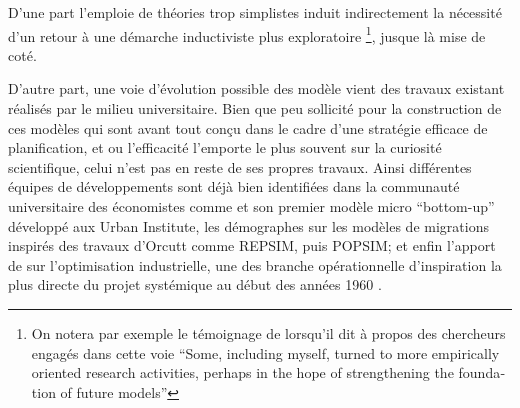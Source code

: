 D'une part l'emploie de théories trop simplistes induit indirectement la nécessité d'un retour à une démarche inductiviste plus exploratoire \footnote{On notera par exemple le témoignage de \autocite{Boyce1988} lorsqu'il dit à propos des chercheurs engagés dans cette voie \foreignquote{english}{Some, including myself, turned to more empirically oriented research activities, perhaps in the hope of strengthening the foundation of future models}}, jusque là mise de coté. 

D'autre part, une voie d'évolution possible des modèle vient des travaux existant réalisés par le milieu universitaire. Bien que peu sollicité \autocite[9]{Batty1994} pour la construction de ces modèles qui sont avant tout conçu dans le cadre d'une stratégie efficace de planification, et ou l'efficacité l'emporte le plus souvent sur la curiosité scientifique, celui n'est pas en reste de ses propres travaux. Ainsi différentes équipes de développements sont déjà bien identifiées dans la communauté universitaire des économistes comme \textcite{Orcutt1960} et son premier modèle micro \foreignquote{english}{bottom-up} développé aux Urban Institute, les démographes sur les modèles de migrations inspirés des travaux d'Orcutt comme REPSIM, puis POPSIM; et enfin l'apport de \textcite{Forrester1961} sur l'optimisation industrielle, une des branche opérationnelle d'inspiration la plus directe du projet systémique au début des années 1960 \autocite{Cohen1961} \autocite[911]{Shubik1960b}.

